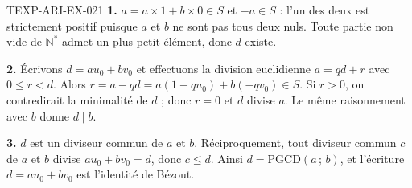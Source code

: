 \begin{corrige}{TEXP-ARI-EX-021}
\textbf{1.} $a=a\times1+b\times0\in S$ et $-a\in S$ : l'un des deux est
strictement positif puisque $a$ et $b$ ne sont pas tous deux nuls. Toute partie
non vide de $\mathbb{N}^*$ admet un plus petit élément, donc $d$ existe.

\textbf{2.} Écrivons $d=au_0+bv_0$ et effectuons la division euclidienne
$a=qd+r$ avec $0\leq r<d$. Alors
$r=a-qd=a(1-qu_0)+b(-qv_0)\in S$. Si $r>0$, on contredirait la minimalité de
$d$ ; donc $r=0$ et $d$ divise $a$. Le même raisonnement avec $b$ donne
$d\mid b$.

\textbf{3.} $d$ est un diviseur commun de $a$ et $b$. Réciproquement, tout
diviseur commun $c$ de $a$ et $b$ divise $au_0+bv_0=d$, donc $c\leq d$. Ainsi
$d=\mathrm{PGCD}(a\,;\,b)$, et l'écriture $d=au_0+bv_0$ est l'identité de
Bézout.
\end{corrige}
